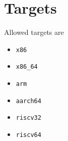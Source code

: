 \documentclass[
   12pt,                         %
   openright,                    %
   twoside,                      %
   a4paper,                      %
   sumario = tradicional,        %
   english,                      %
   xcolor=table                  %
]{abntex2}
\begin{document}
\imprimircapa

\newpage
\tableofcontents
\newpage
\textual






   \postextual
   
   \apendices
   \renewcommand{\thesection}{\Alph{section}}

\section{Targets}
\label{apendice:target}

Allowed targets are
\begin{itemize}
   \item \texttt{x86}
   \item \texttt{x86\_64}
   \item \texttt{arm}
   \item \texttt{aarch64}
   \item \texttt{riscv32}
   \item \texttt{riscv64}
\end{itemize}
\end{document}
